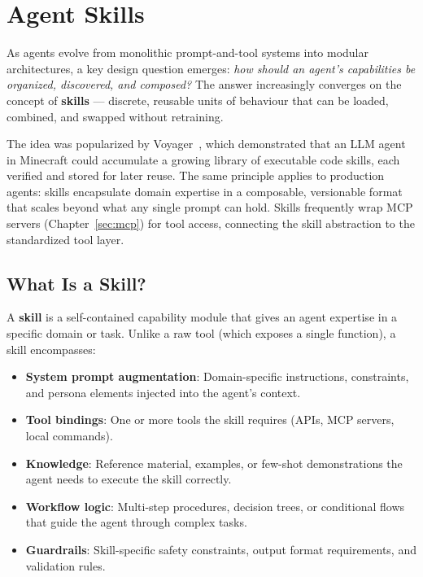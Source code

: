\chapter{Agent Skills}
\label{sec:agent-skills}

As agents evolve from monolithic prompt-and-tool systems into modular architectures, a key design question emerges: \emph{how should an agent’s capabilities be organized, discovered, and composed?} The answer increasingly converges on the concept of \textbf{skills} --- discrete, reusable units of behaviour that can be loaded, combined, and swapped without retraining.

The idea was popularized by Voyager~\cite{wang2023voyager}, which demonstrated that an LLM agent in Minecraft could accumulate a growing library of executable code skills, each verified and stored for later reuse. The same principle applies to production agents: skills encapsulate domain expertise in a composable, versionable format that scales beyond what any single prompt can hold. Skills frequently wrap MCP servers (Chapter~\ref{sec:mcp}) for tool access, connecting the skill abstraction to the standardized tool layer.

\section{What Is a Skill?}
\label{what-is-a-skill}

A \textbf{skill} is a self-contained capability module that gives an agent expertise in a specific domain or task. Unlike a raw tool (which exposes a single function), a skill encompasses:

\begin{itemize}
  \item \textbf{System prompt augmentation}: Domain-specific instructions, constraints, and persona elements injected into the agent’s context.
  \item \textbf{Tool bindings}: One or more tools the skill requires (APIs, MCP servers, local commands).
  \item \textbf{Knowledge}: Reference material, examples, or few-shot demonstrations the agent needs to execute the skill correctly.
  \item \textbf{Workflow logic}: Multi-step procedures, decision trees, or conditional flows that guide the agent through complex tasks.
  \item \textbf{Guardrails}: Skill-specific safety constraints, output format requirements, and validation rules.
\end{itemize}

